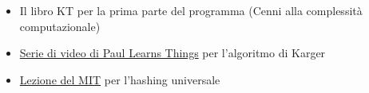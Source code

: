 \documentclass{article}
\begin{document}
\begin{enumerate}
\begin{itemize}
		\item Il libro KT per la prima parte del programma (Cenni alla complessità computazionale)
		
		\item \href{https://www.youtube.com/watch?v=KqMGeNZuwfI}{Serie di video di Paul Learns Things} per l'algoritmo di Karger
		
		\item \href{https://www.youtube.com/watch?v=z0lJ2k0sl1g}{Lezione del MIT} per l'hashing universale
\end{itemize}

\end{enumerate}
\end{document}
